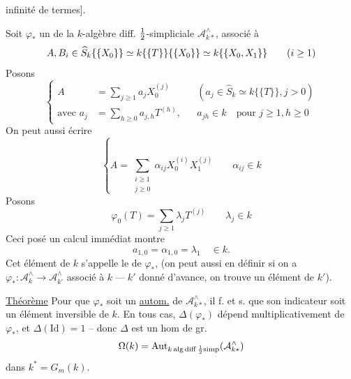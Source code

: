 infinité de termes].

Soit $\varphi_*$ un \uline{} de la
$k$-algèbre diff. ${\tfrac12}$-simpliciale $\mathcal A_{k*}^\wedge$, associé à
\[
 A,{B}_i\in\widehat S_k\{\{X_0\}\}\simeq
 k\{\{T\}\}\{\{X_0\}\}\simeq k\{\{X_0,X_1\}\}
 \qquad(i\geq1)
\]
Posons
\[
 \left\{\begin{aligned}
 A&=\sum_{j\geq1}a_jX_0^{(j)}
 &&(a_j\in\widehat S_k\simeq k\{\{T\}\},j>0)\\
 \text{avec }a_j&=\sum_{h\geq0}a_{j,h}T^{(h)},
 &&a_{jh}\in k\quad\text{pour }j\geq1,h\geq0
 \end{aligned}\right.
\]
On peut aussi écrire
\[
 \left\{A=\sum_{\substack{i\geq1\\j\geq0}}\alpha_{ij}X_0^{(i)}X_1^{(j)}
 \qquad\alpha_{ij}\in k\right.
\]
Posons
\[
 \varphi_0(T)=\sum_{j\geq1}\lambda_jT^{(j)}\qquad\lambda_j\in k
\]
Ceci posé un calcul immédiat montre
\[
 \boxed{a_{1,0}=\alpha_{1,0}=\lambda_1}\quad\in k.
\]
Cet élément de $k$ s'appelle le
de $\varphi_*$, 
(on peut aussi en définir si on a
$\varphi_*:\mathcal A_k^\wedge\longrightarrow \mathcal A_{k'}^\wedge$ associé à
$k\mathbin{\text{---}}k'$ donné d'avance, on trouve un élément de $k'$).

\uline{Théorème} Pour que $\varphi_*$ soit un \uline{autom.}
de $\mathcal A_{k*}^\wedge$, il f. et s. que son indicateur
soit un élément inversible de $k$. En tous cas, $\Delta(\varphi_*)$ dépend multiplicativement
de $\varphi_*$, et $\Delta(\mathrm{Id})=1$ -- donc $\Delta$ est un hom de gr.
\[
 \Omega(k)=\operatorname{Aut}_{k\,\mathrm{alg}\,\mathrm{diff}\,{\frac12\mathrm{simp}}}(\mathcal A_{k*}^\wedge)
\]
dans $k^*=G_m(k)$.
